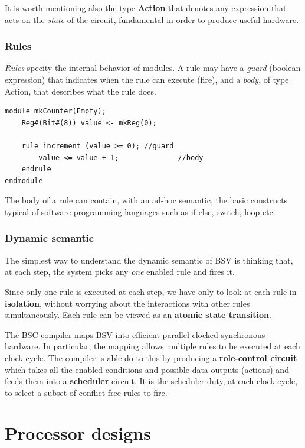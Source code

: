 \documentclass[12pt,oneside,a4paper]{article}
\begin{document}
It is worth mentioning also the type \textbf{Action} that denotes any expression that acts on the \textit{state} of the circuit, fundamental in order to produce useful hardware.
\subsubsection{Rules}
\textit{Rules} specity the internal behavior of modules. A rule may have a \textit{guard} (boolean expression) that indicates when the rule can execute (fire), and a \textit{body}, of type Action, that describes what the rule does.
\begin{lstlisting}[label={bsv:paramtype},caption={Autoincrementing couter with a single rule}]
module mkCounter(Empty);
	Reg#(Bit#(8)) value <- mkReg(0);
	
	rule increment (value >= 0); //guard
		value <= value + 1;			 	 //body
	endrule
endmodule
\end{lstlisting}

The body of a rule can contain, with an ad-hoc semantic, the basic constructs typical of software programming languages such as if-else, switch, loop etc.

\subsubsection{Dynamic semantic}

The simplest way to understand the dynamic semantic of BSV is thinking that, at each step, the system picks any \textit{one} enabled rule and fires it.

Since only one rule is executed at each step, we have only to look at each rule in \textbf{isolation}, without worrying about the interactions with other rules simultaneously. Each rule can be viewed as an \textbf{atomic state transition}.

The BSC compiler maps BSV into efficient parallel clocked synchronous hardware. In particular, the mapping allows multiple rules to be executed at each clock cycle. The compiler is able do to this by producing a \textbf{role-control circuit} which takes all the enabled conditions and possible data outputs (actions) and feeds them into a \textbf{scheduler} circuit. It is the scheduler duty, at each clock cycle, to select a subset of conflict-free rules to fire.

\section{Processor designs}
\end{document}
